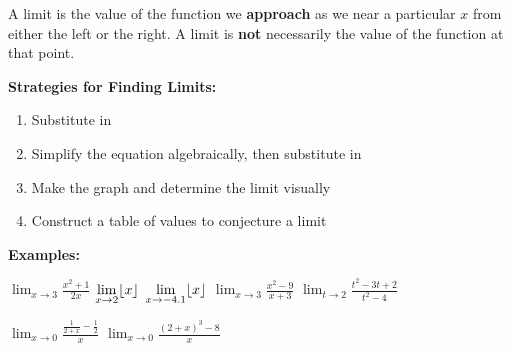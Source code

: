 A limit is the value of the function we \textbf{approach} as we near a particular $x$ from either the left or the right. A limit is \textbf{not} necessarily the value of the function at that point.

\noindent\textbf{Strategies for Finding Limits:}
\begin{enumerate}
    \item Substitute in
    \item Simplify the equation algebraically, then substitute in
    \item Make the graph and determine the limit visually
    \item Construct a table of values to conjecture a limit
\end{enumerate}
\noindent\textbf{Examples:}
\begin{questions}
    \question $\displaystyle\lim_{x\to3}\frac{x^2+1}{2x}$ 
    \question $\displaystyle\lim_{x\to2}\floor*{x}$ 
    \question $\displaystyle\lim_{x\to-4.1}\floor*{x}$ 
    \question $\displaystyle\lim_{x\to3}\frac{x^2-9}{x+3}$ 
    \question $\displaystyle\lim_{t\to2}\frac{t^2-3t+2}{t^2-4}$ 

\newpage

    \question $\displaystyle\lim_{x\to0}\frac{\frac{1}{2+x}-\frac{1}{2}}{x}$ 
    \question $\displaystyle\lim_{x\to0}\frac{(2+x)^3-8}{x}$ 
\end{questions}

